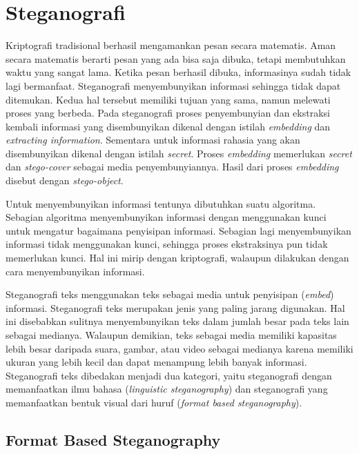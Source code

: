 \section{Steganografi}
\label{sec:steganografi}

Kriptografi tradisional berhasil mengamankan pesan secara matematis\cite{Dpcrypto:2009}. Aman secara matematis berarti pesan yang ada bisa saja dibuka, tetapi membutuhkan waktu yang sangat lama. Ketika pesan berhasil dibuka, informasinya sudah tidak lagi bermanfaat. Steganografi menyembunyikan informasi sehingga tidak dapat ditemukan. Kedua hal tersebut memiliki tujuan yang sama, namun melewati proses yang berbeda. Pada steganografi proses penyembunyian dan ekstraksi kembali informasi yang disembunyikan dikenal dengan istilah \textit{embedding} dan \textit{extracting information}.  Sementara untuk informasi rahasia yang akan disembunyikan dikenal dengan istilah \textit{secret}. Proses \textit{embedding} memerlukan \textit{secret} dan \textit{stego-cover} sebagai media penyembunyiannya. Hasil dari proses \textit{embedding} disebut dengan \textit{stego-object}.

Untuk menyembunyikan informasi tentunya dibutuhkan suatu algoritma. Sebagian algoritma menyembunyikan informasi dengan menggunakan kunci untuk mengatur bagaimana penyisipan informasi. Sebagian lagi menyembunyikan informasi tidak menggunakan kunci, sehingga proses ekstraksinya pun tidak memerlukan kunci. Hal ini mirip dengan kriptografi, walaupun dilakukan dengan cara menyembunyikan informasi.

Steganografi teks menggunakan teks sebagai media untuk penyisipan (\textit{embed}) informasi.  Steganografi teks merupakan jenis yang paling jarang digunakan. Hal ini disebabkan sulitnya menyembunyikan teks dalam jumlah besar pada teks lain sebagai medianya. Walaupun demikian, teks sebagai media memiliki kapasitas lebih besar daripada suara, gambar, atau video sebagai medianya karena memiliki ukuran yang lebih kecil dan dapat menampung lebih banyak informasi. Steganografi teks dibedakan menjadi dua kategori, yaitu steganografi dengan memanfaatkan ilmu bahasa (\textit{linguistic steganography}) dan steganografi yang memanfaatkan bentuk visual dari huruf (\textit{format based steganography}).

\subsection{Format Based Steganography\cite{fbs:2009}}
\label{sec:fb_stegano}

